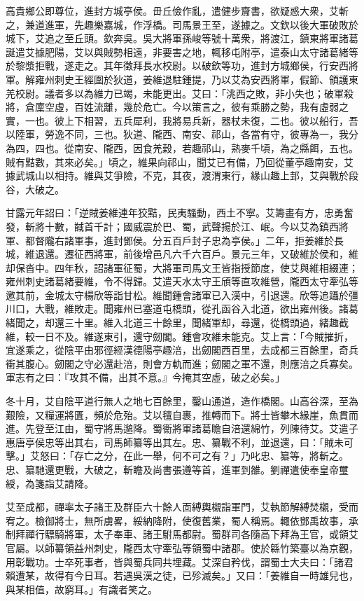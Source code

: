 \begin{pinyinscope}
高貴鄉公即尊位，進封方城亭侯。毌丘儉作亂，遣健步齎書，欲疑惑大衆，艾斬之，兼道進軍，先趣樂嘉城，作浮橋。司馬景王至，遂據之。文欽以後大軍破敗於城下，艾追之至丘頭。欽奔吳。吳大將軍孫峻等號十萬衆，將渡江，鎮東將軍諸葛誕遣艾據肥陽，艾以與賊勢相遠，非要害之地，輒移屯附亭，遣泰山太守諸葛緒等於黎漿拒戰，遂走之。其年徵拜長水校尉。以破欽等功，進封方城鄉侯，行安西將軍。解雍州刺史王經圍於狄道，姜維退駐鍾提，乃以艾為安西將軍，假節、領護東羌校尉。議者多以為維力已竭，未能更出。艾曰：「洮西之敗，非小失也；破軍殺將，倉廩空虛，百姓流離，幾於危亡。今以策言之，彼有乘勝之勢，我有虛弱之實，一也。彼上下相習，五兵犀利，我將易兵新，器杖未復，二也。彼以船行，吾以陸軍，勞逸不同，三也。狄道、隴西、南安、祁山，各當有守，彼專為一，我分為四，四也。從南安、隴西，因食羌穀，若趣祁山，熟麥千頃，為之縣餌，五也。賊有黠數，其來必矣。」頃之，維果向祁山，聞艾已有備，乃回從董亭趣南安，艾據武城山以相持。維與艾爭險，不克，其夜，渡渭東行，緣山趣上邽，艾與戰於段谷，大破之。

甘露元年詔曰：「逆賊姜維連年狡黠，民夷騷動，西土不寧。艾籌畫有方，忠勇奮發，斬將十數，馘首千計；國威震於巴、蜀，武聲揚於江、岷。今以艾為鎮西將軍、都督隴右諸軍事，進封鄧侯。分五百戶封子忠為亭侯。」二年，拒姜維於長城，維退還。遷征西將軍，前後增邑凡六千六百戶。景元三年，又破維於侯和，維却保沓中。四年秋，詔諸軍征蜀，大將軍司馬文王皆指授節度，使艾與維相綴連；雍州刺史諸葛緒要維，令不得歸。艾遣天水太守王頎等直攻維營，隴西太守牽弘等邀其前，金城太守楊欣等詣甘松。維聞鍾會諸軍已入漢中，引退還。欣等追躡於彊川口，大戰，維敗走。聞雍州已塞道屯橋頭，從孔函谷入北道，欲出雍州後。諸葛緒聞之，却還三十里。維入北道三十餘里，聞緒軍却，尋還，從橋頭過，緒趣截維，較一日不及。維遂東引，還守劒閣。鍾會攻維未能克。艾上言：「今賊摧折，宜遂乘之，從陰平由邪徑經漢德陽亭趣涪，出劒閣西百里，去成都三百餘里，奇兵衝其腹心。劒閣之守必還赴涪，則會方軌而進；劒閣之軍不還，則應涪之兵寡矣。軍志有之曰：『攻其不備，出其不意。』今掩其空虛，破之必矣。」

冬十月，艾自陰平道行無人之地七百餘里，鑿山通道，造作橋閣。山高谷深，至為艱險，又糧運將匱，頻於危殆。艾以氊自裹，推轉而下。將士皆攀木緣崖，魚貫而進。先登至江由，蜀守將馬邈降。蜀衞將軍諸葛瞻自涪還綿竹，列陳待艾。艾遣子惠唐亭侯忠等出其右，司馬師纂等出其左。忠、纂戰不利，並退還，曰：「賊未可擊。」艾怒曰：「存亡之分，在此一舉，何不可之有？」乃叱忠、纂等，將斬之。忠、纂馳還更戰，大破之，斬瞻及尚書張遵等首，進軍到雒。劉禪遣使奉皇帝璽綬，為箋詣艾請降。

艾至成都，禪率太子諸王及群臣六十餘人靣縛輿櫬詣軍門，艾執節解縛焚櫬，受而宥之。檢御將士，無所虜畧，綏納降附，使復舊業，蜀人稱焉。輙依鄧禹故事，承制拜禪行驃騎將軍，太子奉車、諸王駙馬都尉。蜀群司各隨高下拜為王官，或領艾官屬。以師纂領益州刺史，隴西太守牽弘等領蜀中諸郡。使於緜竹築臺以為京觀，用彰戰功。士卒死事者，皆與蜀兵同共埋藏。艾深自矜伐，謂蜀士大夫曰：「諸君賴遭某，故得有今日耳。若遇吳漢之徒，已殄滅矣。」又曰：「姜維自一時雄兒也，與某相值，故窮耳。」有識者笑之。


\end{pinyinscope}
